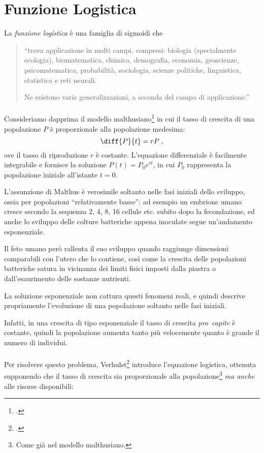 \section{Funzione Logistica}
La \emph{funzione logistica} è una famiglia di sigmoidi che
\blockquote[\cite{WENlogistic}]{``\omissis trova applicazione in molti campi,
compresi: biologia (specialmente ecologia), biomatematica, chimica, demografia, economia,
geoscienze, psicomatematica, probabilità, sociologia, scienze politiche, linguistica,
statistica e reti neurali.

Ne esistono varie generalizzazioni, a seconda del campo di applicazione.''}

\paragraph{}
Consideriamo dapprima il modello malthusiano\footcite{malthus1986essay} in cui il tasso di crescita di una popolazione $P$
è proporzionale alla popolazione medesima:
$$\diff{P}{t} = rP \; , $$
ove il tasso di riproduzione $r$ è costante. L'equazione differenziale è facilmente integrabile e fornisce la soluzione
$P(t) = P_0 e^{rt}$, in cui $P_0$ rappresenta la popolazione iniziale all'istante $t=0$.

L'assunzione di Malthus è verosimile soltanto nelle fasi iniziali dello sviluppo, ossia
per popolazioni ``relativamente basse'': ad esempio un embrione umano cresce secondo la sequenza
2, 4, 8, 16 cellule etc. subito dopo la fecondazione, ed anche lo sviluppo delle colture batteriche appena inoculate
segue un'andamento esponenziale.

Il feto umano però rallenta il suo sviluppo quando raggiunge dimensioni comparabili con l'utero che lo contiene, così
come la crescita delle popolazioni batteriche satura in vicinanza dei limiti fisici imposti dalla piastra o dall'esaurimento
delle sostanze nutrienti.

La soluzione esponenziale non cattura questi fenomeni reali, e quindi descrive propriamente l'evoluzione di una popolazione soltanto nelle fasi iniziali.

Infatti, in una crescita di tipo esponenziale il tasso di crescita \emph{pro~capite} è costante, quindi la popolazione
aumenta tanto più velocemente quanto è grande il numero di individui.

\paragraph{}
Per risolvere questo problema, Verhulst\footcite{verhulst} introduce l'equazione logistica,
ottenuta supponendo che il tasso di crescita sia proporzionale alla popolazione\footnote{Come già nel modello malthusiano.}
\emph{ma anche} alle risorse disponibili:

